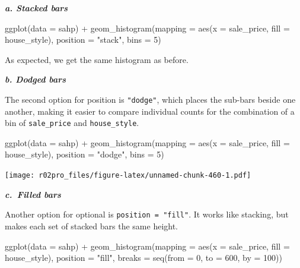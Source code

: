 \documentclass[
]{book}
\newenvironment{Shaded}{\begin{snugshade}}{\end{snugshade}}
\newcommand{\AttributeTok}[1]{\textcolor[rgb]{0.77,0.63,0.00}{#1}}
\newcommand{\DecValTok}[1]{\textcolor[rgb]{0.00,0.00,0.81}{#1}}
\newcommand{\FunctionTok}[1]{\textcolor[rgb]{0.00,0.00,0.00}{#1}}
\newcommand{\NormalTok}[1]{#1}
\newcommand{\SpecialCharTok}[1]{\textcolor[rgb]{0.00,0.00,0.00}{#1}}
\newcommand{\StringTok}[1]{\textcolor[rgb]{0.31,0.60,0.02}{#1}}
\begin{document}
\textbf{\emph{a. Stacked bars}}

\begin{Shaded}
\begin{Highlighting}[]
\FunctionTok{ggplot}\NormalTok{(}\AttributeTok{data =}\NormalTok{ sahp) }\SpecialCharTok{+} \FunctionTok{geom\_histogram}\NormalTok{(}\AttributeTok{mapping =} \FunctionTok{aes}\NormalTok{(}\AttributeTok{x =}\NormalTok{ sale\_price, }\AttributeTok{fill =}\NormalTok{ house\_style), }\AttributeTok{position =} \StringTok{"stack"}\NormalTok{, }\AttributeTok{bins =} \DecValTok{5}\NormalTok{)}
\end{Highlighting}
\end{Shaded}

As expected, we get the same histogram as before.

\textbf{\emph{b. Dodged bars}}

The second option for position is \texttt{"dodge"}, which places the sub-bars beside one another, making it easier to compare individual counts for the combination of a bin of \texttt{sale\_price} and \texttt{house\_style}.

\begin{Shaded}
\begin{Highlighting}[]
\FunctionTok{ggplot}\NormalTok{(}\AttributeTok{data =}\NormalTok{ sahp) }\SpecialCharTok{+} \FunctionTok{geom\_histogram}\NormalTok{(}\AttributeTok{mapping =} \FunctionTok{aes}\NormalTok{(}\AttributeTok{x =}\NormalTok{ sale\_price, }\AttributeTok{fill =}\NormalTok{ house\_style), }\AttributeTok{position =} \StringTok{"dodge"}\NormalTok{, }\AttributeTok{bins =} \DecValTok{5}\NormalTok{)}
\end{Highlighting}
\end{Shaded}

\texttt{[image: r02pro\_files/figure-latex/unnamed-chunk-460-1.pdf]}

\textbf{\emph{c.~Filled bars}}

Another option for optional is \texttt{position\ =\ "fill"}. It works like stacking, but makes each set of stacked bars the same height.

\begin{Shaded}
\begin{Highlighting}[]
\FunctionTok{ggplot}\NormalTok{(}\AttributeTok{data =}\NormalTok{ sahp) }\SpecialCharTok{+} \FunctionTok{geom\_histogram}\NormalTok{(}\AttributeTok{mapping =} \FunctionTok{aes}\NormalTok{(}\AttributeTok{x =}\NormalTok{ sale\_price, }\AttributeTok{fill =}\NormalTok{ house\_style), }\AttributeTok{position =} \StringTok{"fill"}\NormalTok{, }\AttributeTok{breaks =} \FunctionTok{seq}\NormalTok{(}\AttributeTok{from =} \DecValTok{0}\NormalTok{, }\AttributeTok{to =} \DecValTok{600}\NormalTok{, }\AttributeTok{by =} \DecValTok{100}\NormalTok{))}
\end{Highlighting}
\end{Shaded}
\end{document}
